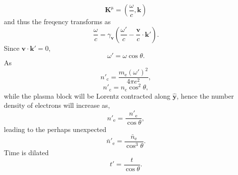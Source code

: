 \begin{equation}
	\mathbf{K}^\mathrm{\mu} = \left(\frac{\omega}{c},\mathbf{k}\right)
\end{equation}
and thus the freqency transforms as
\begin{equation}
	\frac{\omega}{c} = \gamma_\mathbf{v}\left(\frac{\omega'}{c}-\frac{\mathbf{v}}{c}\cdot\mathbf{k'}\right).
\end{equation}
Since $\mathbf{v}\cdot\mathbf{k'} = 0$, 
\begin{equation}\label{eq:boost_omega}
	\omega' = \omega\cos\theta .
\end{equation}
As 
\begin{equation}
	n'_\mathrm{c} = \frac{m_\mathrm{e}(\omega')^2}{4\pi e^2},
\end{equation}
\begin{equation}\label{eq:boost_nc}
	n'_\mathrm{c} =n_\mathrm{c} \cos^2\theta ,
\end{equation}
while the plasma block will be Lorentz contracted along $\hat{\mathbf{y}}$, hence the number density of electrons will increase as,
\begin{equation}
	n'_\mathrm{e} = \frac{n'_\mathrm{e}}{\cos\theta},
\end{equation}
leading to the perhaps unexpected
\begin{equation}
	\bar{n}'_\mathrm{e} = \frac{\bar{n}_\mathrm{e}}{\cos^3\theta}.
\end{equation}
Time is dilated 
\begin{equation}
	t' = \frac{t}{\cos\theta}.
\end{equation}

